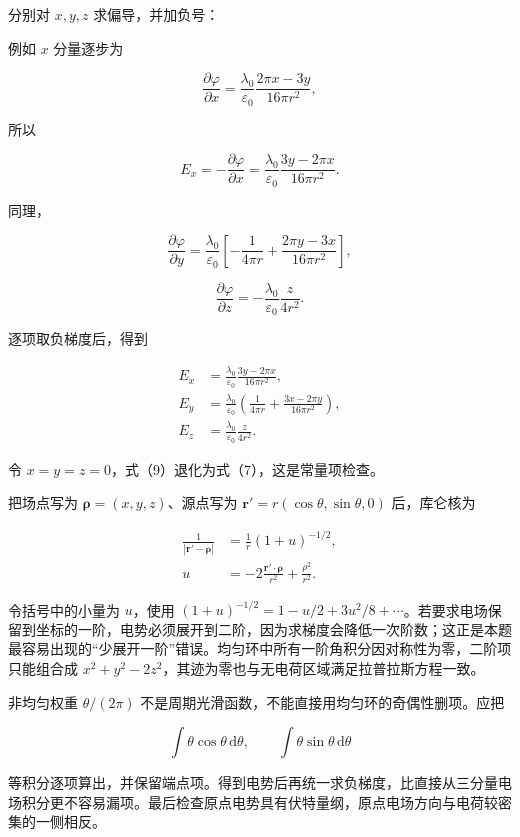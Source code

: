 \documentclass[12pt,a4paper,UTF8]{ctexart}
\begin{document}
分别对 \(x,y,z\) 求偏导，并加负号：

例如 \(x\) 分量逐步为

\[\frac{\partial\varphi}{\partial x}
=\frac{\lambda_0}{\varepsilon_0}
\frac{2\pi x-3y}{16\pi r^2},\]

所以

\[E_x=-\frac{\partial\varphi}{\partial x}
=\frac{\lambda_0}{\varepsilon_0}
\frac{3y-2\pi x}{16\pi r^2}.\]

同理，

\[\frac{\partial\varphi}{\partial y}
=\frac{\lambda_0}{\varepsilon_0}
\left[-\frac1{4\pi r}
+\frac{2\pi y-3x}{16\pi r^2}\right],\]

\[\frac{\partial\varphi}{\partial z}
=-\frac{\lambda_0}{\varepsilon_0}\frac{z}{4r^2}.\]

逐项取负梯度后，得到

\[\boxed{
\begin{aligned}
E_x&=\frac{\lambda_0}{\varepsilon_0}
\frac{3y-2\pi x}{16\pi r^2},\\
E_y&=\frac{\lambda_0}{\varepsilon_0}
\left(\frac1{4\pi r}+\frac{3x-2\pi y}{16\pi r^2}\right),\\
E_z&=\frac{\lambda_0}{\varepsilon_0}\frac{z}{4r^2}.
\end{aligned}
} \tag{9}\]

令 \(x=y=z=0\)，式（9）退化为式（7），这是常量项检查。

把场点写为 \(\boldsymbol\rho=(x,y,z)\)、源点写为
\(\boldsymbol r'=r(\cos\theta,\sin\theta,0)\) 后，库仑核为

\[\begin{aligned}
\frac1{|\boldsymbol r'-\boldsymbol\rho|}
&=\frac1r\left(1+u\right)^{-1/2},\\
u&=-2\frac{\boldsymbol r'\cdot\boldsymbol\rho}{r^2}
+\frac{\rho^2}{r^2}.
\end{aligned}\]

令括号中的小量为 \(u\)，使用
\((1+u)^{-1/2}=1-u/2+3u^2/8+\cdots\)。若要求电场保留到坐标的一阶，电势必须展开到二阶，因为求梯度会降低一次阶数；这正是本题最容易出现的``少展开一阶''错误。均匀环中所有一阶角积分因对称性为零，二阶项只能组合成
\(x^2+y^2-2z^2\)，其迹为零也与无电荷区域满足拉普拉斯方程一致。

非均匀权重 \(\theta/(2\pi)\)
不是周期光滑函数，不能直接用均匀环的奇偶性删项。应把

\[\int\theta\cos\theta\,\mathrm d\theta,
\qquad
\int\theta\sin\theta\,\mathrm d\theta\]

等积分逐项算出，并保留端点项。得到电势后再统一求负梯度，比直接从三分量电场积分更不容易漏项。最后检查原点电势具有伏特量纲，原点电场方向与电荷较密集的一侧相反。
\end{document}
